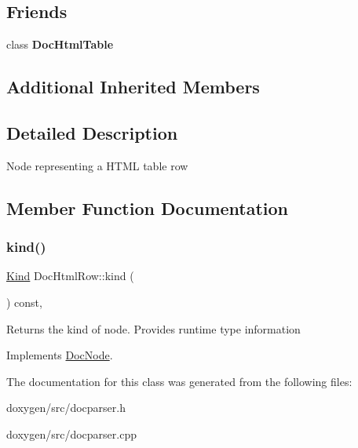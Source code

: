 \subsection*{Friends}
\begin{DoxyCompactItemize}
\item 
\mbox{\label{class_doc_html_row_a1f7413118a8c0d90c891a2695a7cb90d}} 
class {\bfseries Doc\+Html\+Table}
\end{DoxyCompactItemize}
\subsection*{Additional Inherited Members}


\subsection{Detailed Description}
Node representing a H\+T\+ML table row 

\subsection{Member Function Documentation}
\mbox{\label{class_doc_html_row_a0988c30f6aae1a0b855ab4cf485b868f}} 
\subsubsection{\texorpdfstring{kind()}{kind()}}
{\footnotesize\ttfamily \mbox{\hyperlink{class_doc_node_aebd16e89ca590d84cbd40543ea5faadb}{Kind}} Doc\+Html\+Row\+::kind (\begin{DoxyParamCaption}{ }\end{DoxyParamCaption}) const\hspace{0.3cm}{\ttfamily [inline]}, {\ttfamily [virtual]}}

Returns the kind of node. Provides runtime type information 

Implements \mbox{\hyperlink{class_doc_node_a108ffd214a72ba6e93dac084a8f58049}{Doc\+Node}}.



The documentation for this class was generated from the following files\+:\begin{DoxyCompactItemize}
\item 
doxygen/src/docparser.\+h\item 
doxygen/src/docparser.\+cpp\end{DoxyCompactItemize}

